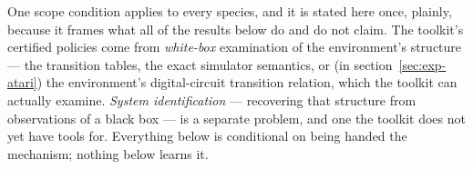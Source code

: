 One scope condition applies to every species, and it is stated here
once, plainly, because it frames what all of the results below do and
do not claim. The toolkit's certified policies come from
\emph{white-box} examination of the environment's structure --- the
transition tables, the exact simulator semantics, or (in
section~\ref{sec:exp-atari}) the environment's digital-circuit
transition relation, which the toolkit can actually examine.
\emph{System identification} --- recovering that structure from
observations of a black box --- is a separate problem, and one the
toolkit does not yet have tools for. Everything below is conditional
on being handed the mechanism; nothing below learns it.

